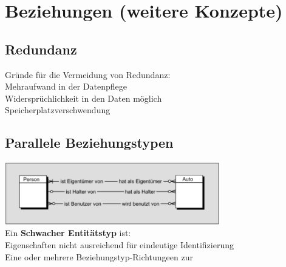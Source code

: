 \documentclass{scrreprt}
\newcommand\tab[1][1cm]{\hspace*{#1}}
\begin{document}
\section{Beziehungen (weitere Konzepte)}
\subsection{Redundanz}
Gründe für die Vermeidung von Redundanz:
\\\tab Mehraufwand in der Datenpflege
\\\tab Widersprüchlichkeit in den Daten möglich 
\\\tab Speicherplatzverschwendung
\subsection{Parallele Beziehungstypen}
\includegraphics[width=0.7\textwidth]{"graphics/parallel-bz"}
\\ Ein \textbf{Schwacher Entitätstyp} ist:
\\\tab Eigenschaften nicht ausreichend für eindeutige Identifizierung
\\\tab Eine oder mehrere Beziehungstyp-Richtungeen zur
\end{document}
